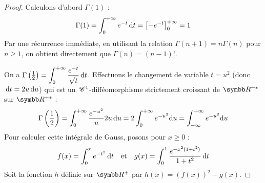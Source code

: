 \begin{proof}
    
    \svspace Calculons d'abord $\Gamma(1)$ :
    \[ \Gamma(1) = \int_0^{+\infty} e^{-t} \,\mathrm{d}t = \left[-e^{-t}\right]_0^{+\infty} = 1 \]
    Par une récurrence immédiate, en utilisant la relation $\Gamma(n+1) = n\Gamma(n)$ pour $n \geqslant 1$, on obtient directement que $\Gamma(n) = (n-1)!$.

    
    \lvspace 
    \avspace 
    \svspace On a $\Gamma\left(\frac{1}{2}\right) = \displaystyle\int_0^{+\infty} \frac{e^{-t}}{\sqrt{t}} \,\mathrm{d}t$.
    Effectuons le changement de variable $t = u^2$ (donc $\,\mathrm{d}t = 2u\,\mathrm{d}u$) qui est un $\,\mathscr C^{1}$-difféomorphisme strictement croissant de $\R^{+*}$ sur $\R^{+*}$ :
    \[ \Gamma\left(\frac{1}{2}\right) = \int_0^{+\infty} \frac{e^{-u^2}}{u} 2u\,\mathrm{d}u = 2 \int_0^{+\infty} e^{-u^2} \mathrm{d}u = \int_{-\infty}^{+\infty} e^{-u^2} \mathrm{d}u \]
    Pour calculer cette intégrale de Gauss, posons pour $x \geqslant 0$ :
    \[ f(x) = \int_0^x e^{-t^2} \,\mathrm{d}t \quad \text{et} \quad g(x) = \int_0^1 \frac{e^{-x^2(1+t^2)}}{1+t^2} \,\mathrm{d}t \]
    Soit la fonction $h$ définie sur $\R^+$ par $h(x) = (f(x))^2 + g(x)$.


\end{proof}

